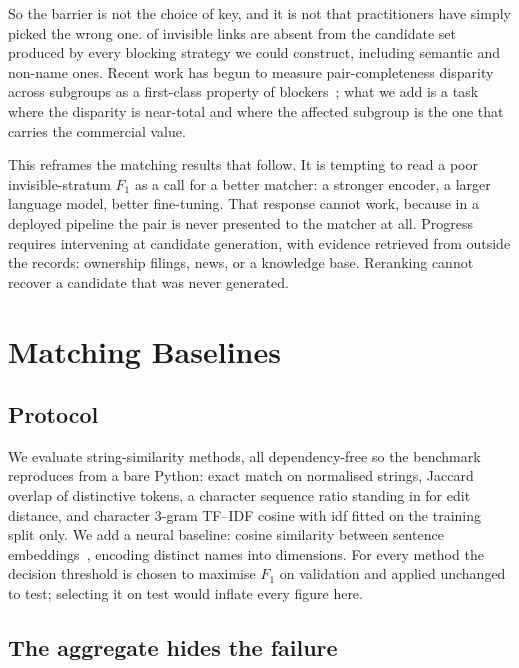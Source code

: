 So the barrier is not the choice of key, and it is not that practitioners have simply
picked the wrong one. \BlkInvisibleLost of invisible links are absent from the candidate
set produced by every blocking strategy we could construct, including semantic and
non-name ones. Recent work has begun to measure pair-completeness disparity across
subgroups as a first-class property of blockers~\citep{gagliardelli2024blockingbias};
what we add is a task where the disparity is near-total and where the affected subgroup
is the one that carries the commercial value.

This reframes the matching results that follow. It is tempting to read a poor
invisible-stratum $F_1$ as a call for a better matcher: a stronger encoder, a larger
language model, better fine-tuning. That response cannot work, because in a deployed
pipeline the pair is never presented to the matcher at all. Progress requires
intervening at candidate generation, with evidence retrieved from outside the records:
ownership filings, news, or a knowledge base. Reranking cannot recover a candidate that
was never generated.

\section{Matching Baselines}
\label{sec:results}

\subsection{Protocol}

We evaluate \NumStringMethods string-similarity methods, all dependency-free so the
benchmark reproduces from a bare Python: exact match on normalised strings, Jaccard
overlap of distinctive tokens, a character sequence ratio standing in for edit distance,
and character 3-gram TF--IDF cosine with idf fitted on the training split only. We add a
neural baseline: cosine similarity between \EmbModel sentence
embeddings~\citep{zeakis2023pretrained}, encoding \EmbNames distinct names into \EmbDim dimensions.
For every method the decision threshold is chosen to maximise $F_1$ on validation and
applied unchanged to test; selecting it on test would inflate every figure here.

\subsection{The aggregate hides the failure}

